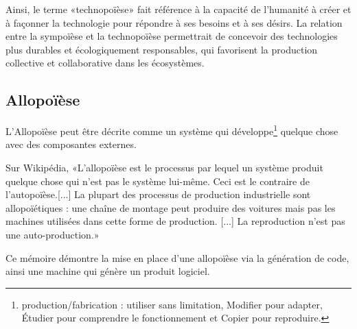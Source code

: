 
Ainsi, le terme «technopoïèse» fait référence à la capacité de l'humanité à créer et à façonner la technologie pour répondre à ses besoins et à ses désirs. La relation entre la sympoïèse et la technopoïèse permettrait de concevoir des technologies plus durables et écologiquement responsables, qui favorisent la production collective et collaborative dans les écosystèmes. 

\subsection{Allopoïèse}

L'Allopoïèse peut être décrite comme un système qui développe\footnote{production/fabrication : utiliser sans limitation, Modifier pour adapter, Étudier pour comprendre le fonctionnement et Copier pour reproduire.} quelque chose avec des composantes externes.

Sur Wikipédia, «L'allopoïèse est le processus par lequel un système produit quelque chose qui n'est pas le système lui-même. Ceci est le contraire de l'autopoïèse.[...] La plupart des processus de production industrielle sont allopoïétiques : une chaîne de montage peut produire des voitures mais pas les machines utilisées dans cette forme de production. [...] La reproduction n'est pas une auto-production.»~\cite{wiki_allopoiesis_2018}~\cite{vuc_allopoiesis_2018}

Ce mémoire démontre la mise en place d'une allopoïèse via la génération de code, ainsi une machine qui génère un produit logiciel.



